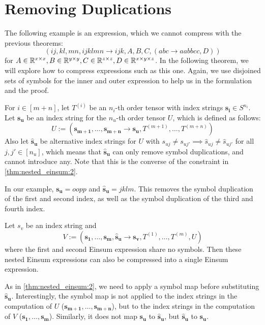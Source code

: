\section{Removing Duplications}

The following example is an expression, which we cannot compress with the previous theorems:
$$(ij, kl, mn, ijklmn \rightarrow ijk, A, B, C, (abc \rightarrow aabbcc, D))$$
for $A \in \mathbb{R}^{x \times x}, B \in \mathbb{R}^{y \times y}, C \in \mathbb{R}^{z \times z}, D \in \mathbb{R}^{x \times y \times z}$.
In the following theorem, we will explore how to compress expressions such as this one.
Again, we use disjoined sets of symbols for the inner and outer expression to help us in the formulation and the proof.

\begin{theorem}
    \label{thm:nested_einsum:3}

    For $i \in [m + n]$, let $T^{(i)}$ be an $n_i$-th order tensor with index strings $\bm{s_i} \in S^{n_i}$.
    Let $\bm{s_u}$ be an index string for the $n_u$-th order tensor $U$, which is defined as follows:
    $$U := (\bm{s_{m + 1}},\dots,\bm{s_{m + n}} \rightarrow \bm{s_u}, T^{(m + 1)},\dots,T^{(m + n)})$$
    Also let $\bm{\hat{s}_u}$ be alternative index strings for $U$ with $s_{uj} \neq s_{uj'} \implies \hat{s}_{uj} \neq \hat{s}_{uj'}$ for all $j, j' \in [n_u]$,
    which means that $\bm{\hat{s}_u}$ can only remove symbol duplications, and cannot introduce any.
    Note that this is the converse of the constraint in \autoref{thm:nested_einsum:2}.

    In our example, $\bm{s_u} = oopp$ and $\bm{\hat{s}_u} = jklm$.
    This removes the symbol duplication of the first and second index, as well as the symbol duplication of the third and fourth index.

    Let $s_v$ be an index string and
    $$V := (\bm{s_1},\dots,\bm{s_m}, \bm{\hat{s}_u} \rightarrow \bm{s_v}, T^{(1)},\dots,T^{(m)}, U)$$
    where the first and second Einsum expression share no symbols.
    Then these nested Einsum expressions can also be compressed into a single Einsum expression.

    As in \autoref{thm:nested_einsum:2}, we need to apply a symbol map before substituting $\bm{\hat{s}_u}$.
    Interestingly, the symbol map is not applied to the index strings in the computation of $U$ ($\bm{s_{m + 1}},\dots,\bm{s_{m + n}}$),
    but to the index strings in the computation of $V$ ($\bm{s_1},\dots,\bm{s_m}$).
    Similarly, it does not map $\bm{s_u}$ to $\bm{\hat{s}_u}$, but $\bm{\hat{s}_u}$ to $\bm{s_u}$.


\end{theorem}
